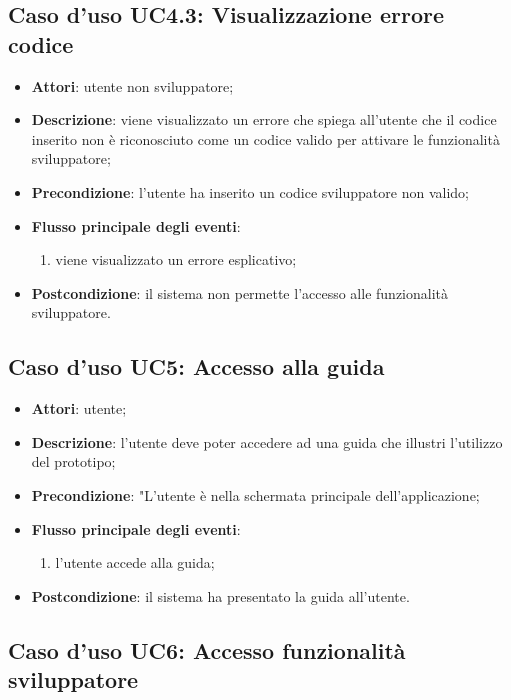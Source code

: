 \documentclass[../AnalisiDeiRequisiti.tex]{subfiles}
\begin{document}
\subsection{Caso d'uso UC4.3: Visualizzazione errore codice}
\begin{itemize}
\item \textbf{Attori}: utente non sviluppatore;
\item \textbf{Descrizione}: viene visualizzato un errore che spiega all'utente che il codice inserito non è riconosciuto come un codice valido per attivare le funzionalità sviluppatore; 
      \item \textbf{Precondizione}: l'utente ha inserito un codice sviluppatore non valido;

        \item \textbf{Flusso principale degli eventi}:
          \begin{enumerate}
          \item viene visualizzato un errore esplicativo;
      \end{enumerate}
    \item \textbf{Postcondizione}: il sistema non permette l'accesso alle funzionalità sviluppatore.
  \end{itemize}
\hypertarget{UC5}{}
\subsection{Caso d'uso UC5: Accesso alla guida}
\begin{itemize}
\item \textbf{Attori}: utente;
\item \textbf{Descrizione}: l'utente deve poter accedere ad una guida che illustri l'utilizzo del prototipo; 
      \item \textbf{Precondizione}: "L'utente è nella schermata principale dell'applicazione;

        \item \textbf{Flusso principale degli eventi}:
          \begin{enumerate}
          \item l'utente accede alla guida;

      \end{enumerate}
    \item \textbf{Postcondizione}: il sistema ha presentato la guida all'utente.
  \end{itemize}
\hypertarget{UC6}{}
\subsection{Caso d'uso UC6: Accesso funzionalità sviluppatore}
\end{document}
